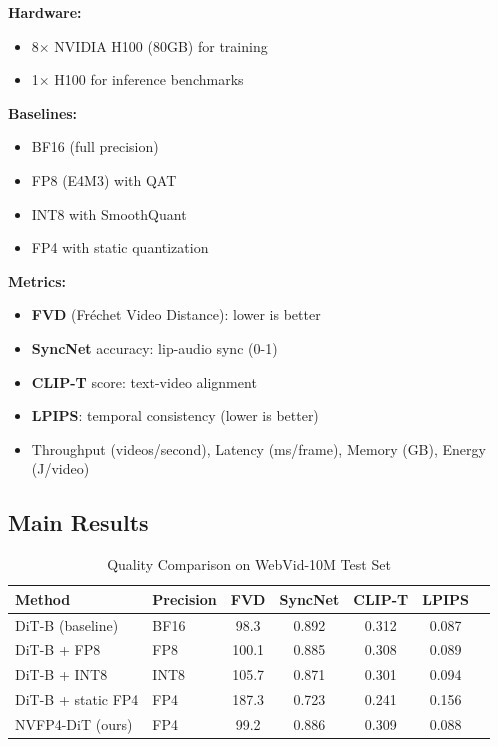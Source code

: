 \documentclass[journal]{IEEEtran}
\theoremstyle{definition}
\theoremstyle{remark}
\begin{document}
\textbf{Hardware:}
\begin{itemize}
    \item 8$\times$ NVIDIA H100 (80GB) for training
    \item 1$\times$ H100 for inference benchmarks
\end{itemize}

\textbf{Baselines:}
\begin{itemize}
    \item BF16 (full precision)
    \item FP8 (E4M3) with QAT \cite{nvidia2022fp8}
    \item INT8 with SmoothQuant \cite{xiao2023smoothquant}
    \item FP4 with static quantization
\end{itemize}

\textbf{Metrics:}
\begin{itemize}
    \item \textbf{FVD} (Fréchet Video Distance): lower is better
    \item \textbf{SyncNet} accuracy: lip-audio sync (0-1)
    \item \textbf{CLIP-T} score: text-video alignment
    \item \textbf{LPIPS}: temporal consistency (lower is better)
    \item Throughput (videos/second), Latency (ms/frame), Memory (GB), Energy (J/video)
\end{itemize}

\subsection{Main Results}

\begin{table}[t]
\centering
\caption{Quality Comparison on WebVid-10M Test Set}
\label{tab:main_results}
\begin{tabular}{llccccc}
\toprule
Method & Precision & FVD & SyncNet & CLIP-T & LPIPS \\
\midrule
DiT-B (baseline) & BF16 & 98.3 & 0.892 & 0.312 & 0.087 \\
DiT-B + FP8 & FP8 & 100.1 & 0.885 & 0.308 & 0.089 \\
DiT-B + INT8 & INT8 & 105.7 & 0.871 & 0.301 & 0.094 \\
DiT-B + static FP4 & FP4 & 187.3 & 0.723 & 0.241 & 0.156 \\
NVFP4-DiT (ours) & FP4 & 99.2 & 0.886 & 0.309 & 0.088 \\
\bottomrule
\end{tabular}
\end{table}
\end{document}
